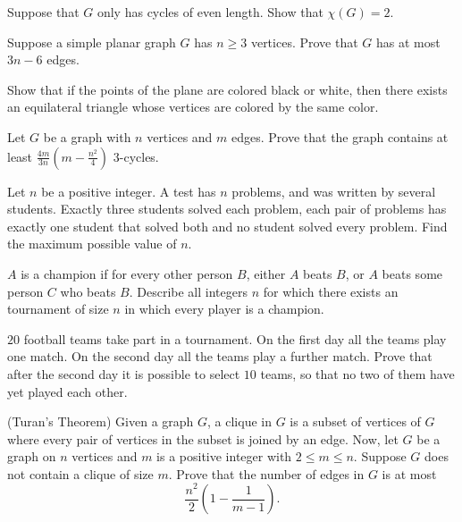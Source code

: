 \documentclass[12pt]{article}
\begin{document}
        \begin{exercise}
        Suppose that $G$ only has cycles of even length. Show that $\chi(G) = 2$.
        \end{exercise}
        
        \begin{exercise}
        Suppose a simple planar graph $G$ has $n \geq 3$ vertices. Prove that $G$ has at most $3n - 6$ edges. 
        \end{exercise}
        
        \begin{exercise}
        Show that if the points of the plane are colored black or white, then there exists an equilateral triangle whose vertices are colored by the same color.
        \end{exercise}
        
        \begin{exercise}
        Let $G$ be a graph with $n$ vertices and $m$ edges. Prove that the graph contains at least $\frac{4m}{3n}(m - \frac{n^{2}}{4})$ $3$-cycles.
        \end{exercise}
        
        \begin{exercise}
        Let $n$ be a positive integer. A test has $n$ problems, and was written by several students. Exactly three students solved each problem, each pair of problems has exactly one student that solved both and no student solved every problem. Find the maximum possible value of $n$.
        \end{exercise}
        
        \begin{exercise}
        $A$ is a champion if for every other person $B$, either $A$ beats $B$, or $A$ beats some person $C$ who beats $B$. Describe all integers $n$ for which there exists an tournament of size $n$ in which every player is a champion.
        \end{exercise}
        
        \begin{exercise}
        $20$ football teams take part in a tournament. On the first day all the teams play one match. On the second day all the teams play a further match. Prove that after the second day it is possible to select $10$ teams, so that no two of them have yet played each other.
        \end{exercise}
        
        \begin{exercise}(Turan's Theorem)
        Given a graph $G$, a clique in $G$ is a subset of vertices of $G$ where every pair of vertices in the subset is joined by an edge. Now, let $G$ be a graph on $n$ vertices and $m$ is a positive integer with $2 \leq m \leq n$. Suppose $G$ does not contain a clique of size $m$. Prove that the number of edges in $G$ is at most 
        \[\frac{n^{2}}{2}\left(1 - \frac{1}{m - 1}\right).\]
        \end{exercise}
        
\end{document}
